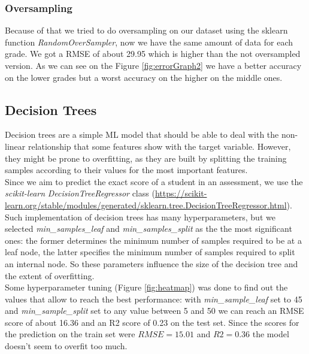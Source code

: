 \documentclass{article}
\begin{document}
\subsubsection{Oversampling}
Because of that we tried to do oversampling on our dataset using the sklearn function \textit{RandomOverSampler}, now we have the same amount of data for each grade. 
We got a RMSE of about 29.95 which is higher than the not oversampled version. As we can see on the Figure \ref{fig:errorGraph2} we have a better accuracy on the lower grades but a worst accuracy on the higher on the middle ones.






\FloatBarrier

\subsection{Decision Trees}

Decision trees are a simple ML model that should be able to deal with the non-linear relationship that some features show with the target variable. However, they might be prone to overfitting, as they are built by splitting the training samples according to their values for the most important features.\\

Since we aim to predict the exact score of a student in an assessment, we use the \textit{scikit-learn} \textit{DecisionTreeRegressor} class (\url{https://scikit-learn.org/stable/modules/generated/sklearn.tree.DecisionTreeRegressor.html}). Such implementation of decision trees has many hyperparameters, but we selected \textit{min\_samples\_leaf} and \textit{min\_samples\_split} as the the most significant ones: the former determines the minimum number of samples required to be at a leaf node, the latter specifies the minimum number of samples required to split an internal node. So these parameters influence the size of the decision tree and the extent of overfitting.\\

Some hyperparameter tuning (Figure \ref{fig:heatmap}) was done to find out the values that allow to reach the best performance: with \textit{min\_sample\_leaf} set to 45 and \textit{min\_sample\_split} set to any value between 5 and 50 we can reach an RMSE score of about 16.36 and an R2 score of 0.23 on the test set. Since the scores for the prediction on the train set were $RMSE = 15.01$ and $R2 = 0.36$ the model doesn't seem to overfit too much. \\
\end{document}
